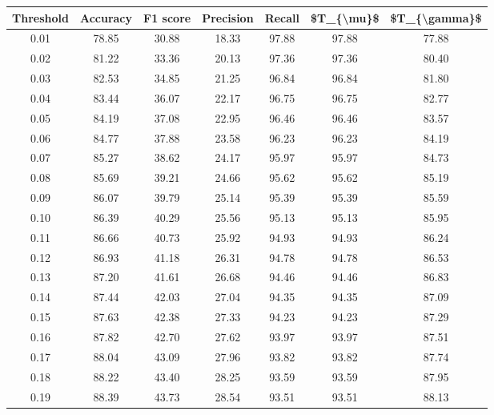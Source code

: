 \begin{tabular}{|c|c|c|c|c|c|c|}
\hline
 Threshold &  Accuracy &  F1 score &  Precision &  Recall &  \$T\_\{\textbackslash mu\}\$ &  \$T\_\{\textbackslash gamma\}\$ \\
\hline
      0.01 &     78.85 &     30.88 &      18.33 &   97.88 &      97.88 &         77.88 \\
      0.02 &     81.22 &     33.36 &      20.13 &   97.36 &      97.36 &         80.40 \\
      0.03 &     82.53 &     34.85 &      21.25 &   96.84 &      96.84 &         81.80 \\
      0.04 &     83.44 &     36.07 &      22.17 &   96.75 &      96.75 &         82.77 \\
      0.05 &     84.19 &     37.08 &      22.95 &   96.46 &      96.46 &         83.57 \\
      0.06 &     84.77 &     37.88 &      23.58 &   96.23 &      96.23 &         84.19 \\
      0.07 &     85.27 &     38.62 &      24.17 &   95.97 &      95.97 &         84.73 \\
      0.08 &     85.69 &     39.21 &      24.66 &   95.62 &      95.62 &         85.19 \\
      0.09 &     86.07 &     39.79 &      25.14 &   95.39 &      95.39 &         85.59 \\
      0.10 &     86.39 &     40.29 &      25.56 &   95.13 &      95.13 &         85.95 \\
      0.11 &     86.66 &     40.73 &      25.92 &   94.93 &      94.93 &         86.24 \\
      0.12 &     86.93 &     41.18 &      26.31 &   94.78 &      94.78 &         86.53 \\
      0.13 &     87.20 &     41.61 &      26.68 &   94.46 &      94.46 &         86.83 \\
      0.14 &     87.44 &     42.03 &      27.04 &   94.35 &      94.35 &         87.09 \\
      0.15 &     87.63 &     42.38 &      27.33 &   94.23 &      94.23 &         87.29 \\
      0.16 &     87.82 &     42.70 &      27.62 &   93.97 &      93.97 &         87.51 \\
      0.17 &     88.04 &     43.09 &      27.96 &   93.82 &      93.82 &         87.74 \\
      0.18 &     88.22 &     43.40 &      28.25 &   93.59 &      93.59 &         87.95 \\
      0.19 &     88.39 &     43.73 &      28.54 &   93.51 &      93.51 &         88.13 \\

\end{tabular}
